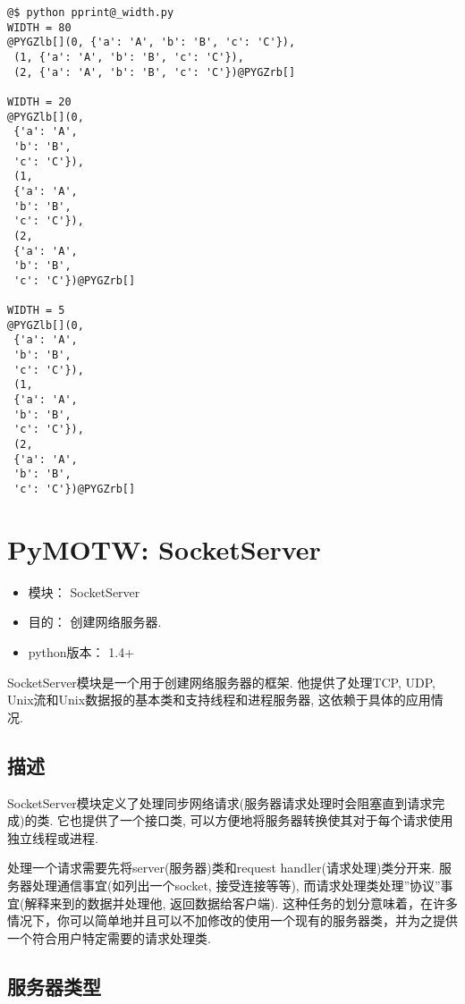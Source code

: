 \documentclass[a4paper,10pt,english]{manual}
\begin{document}
\begin{Verbatim}[commandchars=@\[\]]
@$ python pprint@_width.py
WIDTH = 80
@PYGZlb[](0, {'a': 'A', 'b': 'B', 'c': 'C'}),
 (1, {'a': 'A', 'b': 'B', 'c': 'C'}),
 (2, {'a': 'A', 'b': 'B', 'c': 'C'})@PYGZrb[]

WIDTH = 20
@PYGZlb[](0,
 {'a': 'A',
 'b': 'B',
 'c': 'C'}),
 (1,
 {'a': 'A',
 'b': 'B',
 'c': 'C'}),
 (2,
 {'a': 'A',
 'b': 'B',
 'c': 'C'})@PYGZrb[]

WIDTH = 5
@PYGZlb[](0,
 {'a': 'A',
 'b': 'B',
 'c': 'C'}),
 (1,
 {'a': 'A',
 'b': 'B',
 'c': 'C'}),
 (2,
 {'a': 'A',
 'b': 'B',
 'c': 'C'})@PYGZrb[]
\end{Verbatim}

\resetcurrentobjects


\chapter{PyMOTW: SocketServer}
\begin{itemize}
\item {} 
模块： SocketServer

\item {} 
目的： 创建网络服务器.

\item {} 
python版本： 1.4+

\end{itemize}

SocketServer模块是一个用于创建网络服务器的框架. 他提供了处理TCP, UDP, Unix流和Unix数据报的基本类和支持线程和进程服务器, 这依赖于具体的应用情况.


\section{描述}

SocketServer模块定义了处理同步网络请求(服务器请求处理时会阻塞直到请求完成)的类. 它也提供了一个接口类, 可以方便地将服务器转换使其对于每个请求使用独立线程或进程.

处理一个请求需要先将server(服务器)类和request handler(请求处理)类分开来. 服务器处理通信事宜(如列出一个socket, 接受连接等等), 而请求处理类处理''协议''事宜(解释来到的数据并处理他, 返回数据给客户端). 这种任务的划分意味着，在许多情况下，你可以简单地并且可以不加修改的使用一个现有的服务器类，并为之提供一个符合用户特定需要的请求处理类.


\section{服务器类型}
\end{document}

